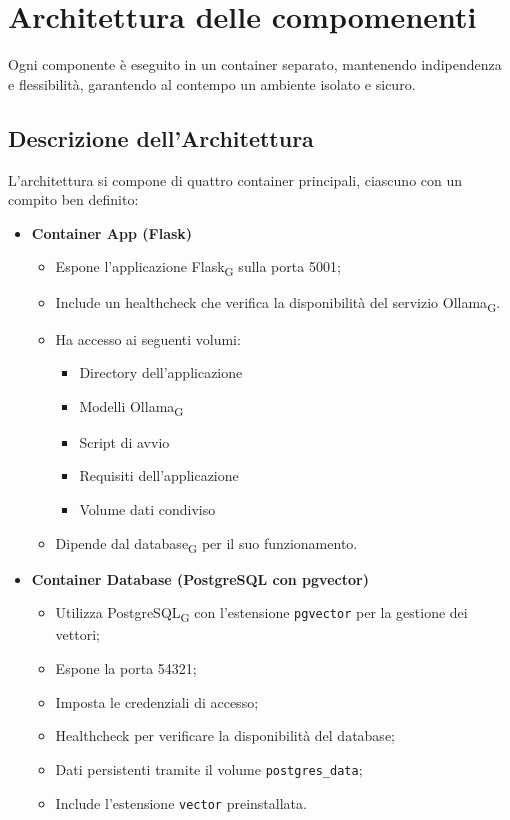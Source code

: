 \section{Architettura delle compomenenti }

 Ogni componente è eseguito in un container separato, mantenendo indipendenza e flessibilità, garantendo al contempo un ambiente isolato e sicuro.

\subsection{Descrizione dell'Architettura}

L'architettura si compone di quattro container principali, ciascuno con un compito ben definito:

\begin{itemize}
    \item \textbf{Container App (Flask)}
    \begin{itemize}
        \item Espone l'applicazione Flask\textsubscript{G} sulla porta 5001;
        \item Include un healthcheck che verifica la disponibilità del servizio Ollama\textsubscript{G}.
        \item Ha accesso ai seguenti volumi:
        \begin{itemize}
            \item Directory dell'applicazione
            \item Modelli Ollama\textsubscript{G}
            \item Script di avvio
            \item Requisiti dell'applicazione
            \item Volume dati condiviso
        \end{itemize}
        \item Dipende dal database\textsubscript{G} per il suo funzionamento.
    \end{itemize}

    \item \textbf{Container Database (PostgreSQL con pgvector)}
    \begin{itemize}
        \item Utilizza PostgreSQL\textsubscript{G} con l'estensione \texttt{pgvector} per la gestione dei vettori;
        \item Espone la porta 54321;
        \item Imposta le credenziali di accesso;
        \item Healthcheck per verificare la disponibilità del database;
        \item Dati persistenti tramite il volume \texttt{postgres\_data};
        \item Include l'estensione \texttt{vector} preinstallata.
    \end{itemize}


\end{itemize}
